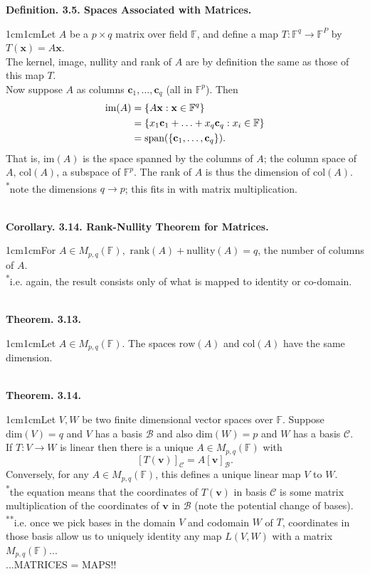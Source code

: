 \documentclass{article}
\newcommand{\vect}[1]{\mathbf{#1}}
\newcommand{\definition}[2]{\textbf{Definition. #1.}\begin{adjustwidth}{1cm}{1cm}#2\end{adjustwidth}}
\newcommand{\theorem}[2]{\textbf{Theorem. #1.}\begin{adjustwidth}{1cm}{1cm}#2\end{adjustwidth}}
\newcommand{\corollary}[2]{\textbf{Corollary. #1.}\begin{adjustwidth}{1cm}{1cm}#2\end{adjustwidth}}
\begin{document}
\definition{3.5. Spaces Associated with Matrices}{Let $A$ be a $p \times q$ matrix over field $\mathbb{F}$, and define a map $T: \mathbb{F}^q \rightarrow \mathbb{F}^P$ by $T(\vect{x}) = A\vect{x}$.\\The kernel, image, nullity and rank of $A$ are by definition the same as those of this map $T$.\\Now suppose $A$ as columns $\vect{c}_1, \ldots , \vect{c}_q$ (all in $\mathbb{F}^p$). Then \begin{align} \text{im}(A) &= \{A \vect{x}: \vect{x} \in \mathbb{F}^q \} \notag \\ &= \{ x_1 \vect{c}_1 + \ldots + x_q \vect{c}_q : x_i \in \mathbb{F} \} \notag \\ &= \text{span}( \{ \vect{c}_1 , \ldots , \vect{c}_q \}) \notag. \end{align}That is, $\text{im}(A)$ is the space spanned by the columns of $A$; the column space of $A$, $\text{col}(A)$, a subspace of $\mathbb{F}^p$. The rank of $A$ is thus the dimension of $\text{col}(A)$.\\[1\baselineskip]\textsuperscript{*}note the dimensions $q \rightarrow p$; this fits in with matrix multiplication.}~\\
\corollary{3.14. Rank-Nullity Theorem for Matrices}{For $A \in M_{p,q}(\mathbb{F}),$ $\text{rank}(A) + \text{nullity}(A) = q$, the number of columns of $A$.\\\textsuperscript{*}i.e. again, the result consists only of what is mapped to identity or co-domain.}~\\
\theorem{3.13}{Let $A \in M_{p,q}(\mathbb{F})$. The spaces $\text{row}(A)$ and $\text{col}(A)$ have the same dimension.}~\\
\theorem{3.14}{Let $V, W$ be two finite dimensional vector spaces over $\mathbb{F}$. Suppose $\text{dim}(V) = q$ and $V$ has a basis $\mathcal{B}$ and also $\text{dim}(W) = p$ and $W$ has a basis $\mathcal{C}$.\\If $T: V \rightarrow W$ is linear then there is a unique $A \in M_{p,q}(\mathbb{F})$ with \[ [T(\vect{v})]_\mathcal{C} = A[\vect{v}]_\mathcal{B}.\]Conversely, for any $A \in M_{p,q}(\mathbb{F})$, this defines a unique linear map $V$ to $W$.\\[1\baselineskip]\textsuperscript{*}the equation means that the coordinates of $T(\vect{v})$ in basis $\mathcal{C}$ is some matrix multiplication of the coordinates of $\vect{v}$ in $\mathcal{B}$ (note the potential change of bases).\\\textsuperscript{**}i.e. once we pick bases in the domain $V$ and codomain $W$ of $T$, coordinates in those basis allow us to uniquely identity any map $L(V,W)$ with a matrix $M_{p,q}(\mathbb{F})$...\\...MATRICES = MAPS!!}\newpage
\end{document}
